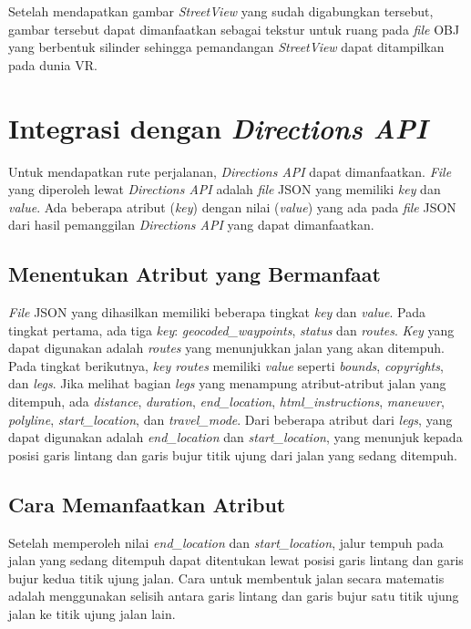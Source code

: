 Setelah mendapatkan gambar \textit{StreetView} yang sudah digabungkan tersebut, gambar tersebut dapat dimanfaatkan sebagai tekstur untuk ruang pada \textit{file} OBJ yang berbentuk silinder sehingga pemandangan \textit{StreetView} dapat ditampilkan pada dunia VR.

\section{Integrasi dengan \textit{Directions API}}
Untuk mendapatkan rute perjalanan, \textit{Directions API} dapat dimanfaatkan. 
\textit{File} yang diperoleh lewat \textit{Directions API} adalah \textit{file} JSON yang memiliki \textit{key} dan \textit{value}. Ada beberapa atribut (\textit{key}) dengan nilai (\textit{value}) yang ada pada \textit{file} JSON dari hasil pemanggilan \textit{Directions API} yang dapat dimanfaatkan.

\subsection{Menentukan Atribut yang Bermanfaat}
\textit{File} JSON yang dihasilkan memiliki beberapa tingkat \textit{key} dan \textit{value}. Pada tingkat pertama, ada tiga \textit{key}: \textit{geocoded\_waypoints}, \textit{status} dan \textit{routes}. \textit{Key} yang dapat digunakan adalah \textit{routes} yang menunjukkan jalan yang akan ditempuh. Pada tingkat berikutnya, \textit{key routes} memiliki \textit{value} seperti \textit{bounds}, \textit{copyrights}, dan \textit{legs}. Jika melihat bagian \textit{legs} yang menampung atribut-atribut jalan yang ditempuh, ada {\it distance}, {\it duration}, {\it end\_location}, {\it html\_instructions}, {\it maneuver}, {\it polyline}, {\it start\_location}, dan \textit{travel\_mode}. Dari beberapa atribut dari \textit{legs}, yang dapat digunakan adalah \textit{end\_location} dan \textit{start\_location}, yang menunjuk kepada posisi garis lintang dan garis bujur titik ujung dari jalan yang sedang ditempuh. 

\subsection{Cara Memanfaatkan Atribut}
\label{subs:directions-attr-use}
Setelah memperoleh nilai \textit{end\_location} dan \textit{start\_location}, jalur tempuh pada jalan yang sedang ditempuh dapat ditentukan lewat posisi garis lintang dan garis bujur kedua titik ujung jalan. Cara untuk membentuk jalan secara matematis adalah menggunakan selisih antara garis lintang dan garis bujur satu titik ujung jalan ke titik ujung jalan lain. 


